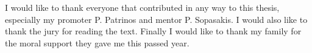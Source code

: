 \documentclass[master=ewit]{kulemt}
\begin{document}
\begin{preface}
I would like to thank everyone that contributed in any way to this thesis, especially my promoter P. Patrinos and mentor P. Sopasakis. I would also like to thank the jury for reading the text. Finally I would like to thank my family for the moral support they gave me this passed year.
\end{preface}

\tableofcontents*



\listoffigures
\listoftables



\mainmatter

%










\appendixpage*          %
\appendix


\backmatter


\end{document}
